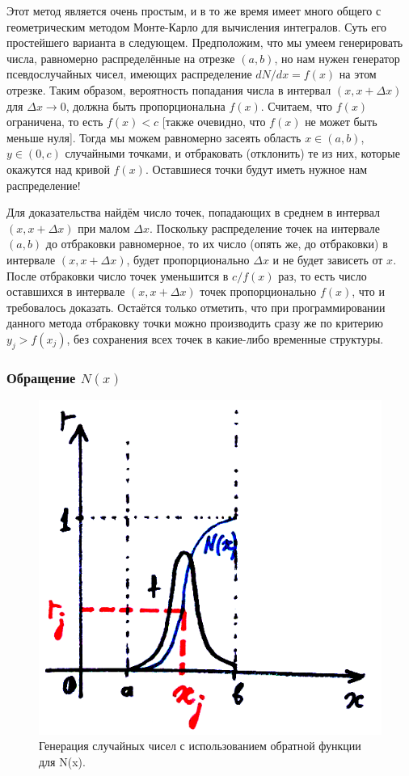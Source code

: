 \documentclass{book}
\begin{document}
Этот метод является очень простым, и в то же время имеет много общего с геометрическим методом
Монте-Карло для вычисления интегралов. Суть его простейшего варианта в следующем. Предположим, что
мы умеем генерировать числа, равномерно распределённые на отрезке $(a, b)$, но нам нужен генератор
псевдослучайных чисел, имеющих распределение $dN/dx = f(x)$ на этом отрезке. Таким образом,
вероятность попадания числа в интервал $(x, x + \Delta x)$ для $\Delta x \to 0$, должна быть
пропорциональна $f(x)$.  Считаем, что $f(x)$ ограничена, то есть $f(x) < c$ [также очевидно, что
$f(x)$ не может быть меньше нуля]. Тогда мы можем равномерно засеять область $x \in (a, b)$, $y \in
(0, c)$ случайными точками, и отбраковать (отклонить) те из них, которые окажутся над кривой $f(x)$.
Оставшиеся точки будут иметь нужное нам распределение!

Для доказательства найдём число точек, попадающих в среднем в интервал $(x, x + \Delta x)$ при
малом $\Delta x$. Поскольку распределение точек на интервале $(a, b)$ до отбраковки равномерное, то
их число (опять же, до отбраковки) в интервале $(x, x + \Delta x)$, будет пропорционально $\Delta
x$ и не будет зависеть от $x$. После отбраковки число точек уменьшится в $c / f(x)$ раз, то есть
число оставшихся в интервале $(x, x + \Delta x)$ точек пропорционально $f(x)$, что и требовалось
доказать. Остаётся только отметить, что при программировании данного метода отбраковку точки можно
производить сразу же по критерию $y_j > f(x_j)$, без сохранения всех точек в какие-либо временные
структуры.

\subsubsection{Обращение $N(x)$}

\begin{figure}
	\includegraphics[width=0.6\linewidth]{inversion-of-N.png}
    \caption{\label{dots-for-monte-carlo}Генерация случайных чисел с использованием обратной
    функции для N(x).}
\end{figure}
\end{document}
